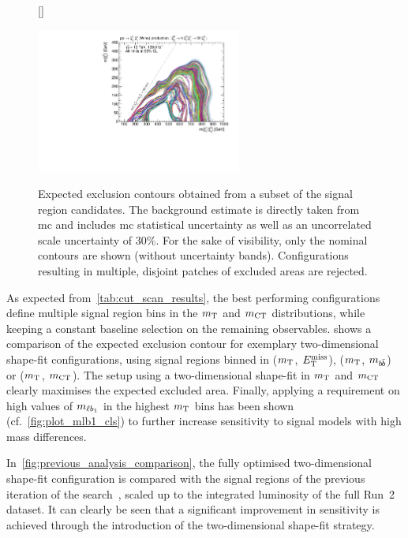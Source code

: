 \begin{figure}
[\FBwidth]
{\caption{Expected exclusion contours obtained from a subset of the signal region candidates. The background estimate is directly taken from \gls{mc} and includes \gls{mc} statistical uncertainty as well as an uncorrelated scale uncertainty of 30\%. For the sake of visibility, only the nominal contours are shown (without uncertainty bands). Configurations resulting in multiple, disjoint patches of excluded areas are rejected.}\label{fig:fit_scan_optimisation}}
{\includegraphics[width=0.60\textwidth]{HF/batch_compare}}
\end{figure}

As expected from~\cref{tab:cut_scan_results}, the best performing configurations define multiple signal region bins in the $m_{\textrm{T}}$ and $m_{\textrm{CT}}$ distributions, while keeping a constant baseline selection on the remaining observables.
 shows a comparison of the expected exclusion contour for exemplary two-dimensional shape-fit configurations, using signal regions binned in ($m_{\textrm{T}}$, $E_{\textrm{T}}^{\textrm{miss}}$), ($m_{\textrm{T}}$, $m_{b\hspace{-0.06em}\bar{b}}$) or ($m_{\textrm{T}}$, $m_{\textrm{CT}}$).
The setup using a two-dimensional shape-fit in $m_{\textrm{T}}$ and $m_{\textrm{CT}}$ clearly maximises the expected excluded area.
Finally, applying a requirement on high values of $m_{\ell b_{1}}$ in the highest $m_{\textrm{T}}$ bins has been shown (cf.~\cref{fig:plot_mlb1_cls}) to further increase sensitivity to signal models with high mass differences. 

In~\cref{fig:previous_analysis_comparison}, the fully optimised two-dimensional shape-fit configuration is compared with the signal regions of the previous iteration of the search~\cite{SUSY-2017-01}, scaled up to the integrated luminosity of the full Run~2 dataset.
It can clearly be seen that a significant improvement in sensitivity is achieved through the introduction of the two-dimensional shape-fit strategy.

